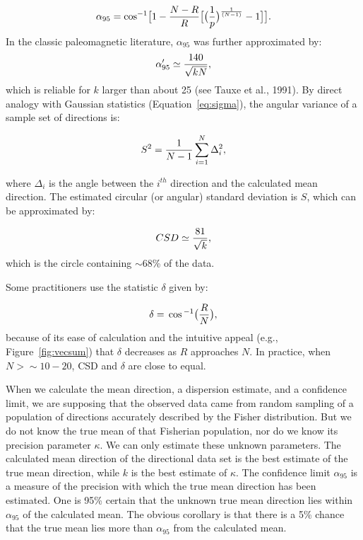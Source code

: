\begin{equation}
\alpha_{95}=\hbox {cos}^{-1}\bigl[1 - {{N-R}\over {R}}\bigl[
\bigl({1\over {p}}\bigr)^{1\over
{(N-1)}}-1\bigr]\bigr].
\label{eq:a95}
\end{equation}
In the classic paleomagnetic literature, $\alpha_{95}$ was further approximated
by:
$$
\alpha_{95}' \simeq {{140}\over {\sqrt{k N}}} ,
$$
\noindent which is  reliable for $k$ larger than
about 25 (see 
 Tauxe et al., 1991).\nocite{tauxe91} 
By direct analogy with Gaussian statistics (Equation~\ref{eq:sigma}), the angular variance of a sample set of directions is:

\begin{equation}
S^2 = { 1 \over {N-1}} \sum_{i=1} ^N \Delta_i^2,
\label{eq:S}
\end{equation}

\noindent where $\Delta_i$ is the angle between the $i^{th}$ direction and the calculated mean direction.  The estimated
 circular (or angular) standard deviation is $S$, which can be approximated by: 


\begin{equation}
CSD \simeq {{81}\over {\sqrt{k}}},
\label{eq:csd}
\end{equation}
\noindent which is the circle containing $\sim$68\% of the data.

Some practitioners use the statistic $\delta$ given by:

\begin{equation}
\delta = \cos^{-1} \bigl( {R\over N} \bigr),
\label{eq:del}
\end{equation}
\noindent because of its ease of calculation and the intuitive appeal (e.g., Figure~\ref{fig:vecsum}) that $\delta$ decreases as $R$ approaches $N$.  In practice,  when $N>\sim 10-20$,  CSD and $\delta$ are close to equal.  


When we calculate the mean direction, a dispersion estimate, and a confidence limit, we are supposing
that the observed data came from random sampling of a population of directions accurately
described by the 
Fisher distribution. But we do not know the true mean of that Fisherian population,
nor do we know its precision parameter $\kappa$. We can only estimate these unknown parameters. The
calculated mean direction of the directional data set is the best estimate of the true mean direction,
while $k$ is the best estimate of $\kappa$. The confidence limit $ \alpha_{95}$ is a measure of the precision with which the
true mean direction has been estimated. One is 95\% certain that the unknown true mean direction lies
within $\alpha_{95}$ of the calculated mean. The obvious corollary is that there is a 5\% chance that the true
mean lies more than $\alpha_{95}$ from the calculated mean.


